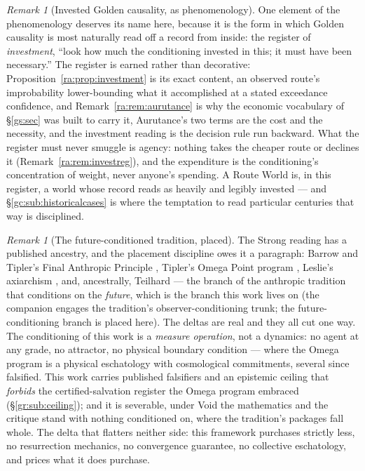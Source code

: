 \documentclass[11pt]{article}
\numberwithin{equation}{section}
\theoremstyle{plain}
\theoremstyle{definition}
\theoremstyle{remark}
\newtheorem{remark}[theorem]{Remark}
\begin{document}
\begin{remark}[Invested Golden causality, as phenomenology]
\label{gc:rem:invested}
One element of the phenomenology deserves its name here, because it is
the form in which Golden causality is most naturally read off a record
from inside: the register of \emph{investment}, ``look how much the
conditioning invested in this; it must have been necessary.'' The
register is earned rather than decorative:
Proposition~\ref{ra:prop:investment} is its exact content, an observed
route's improbability lower-bounding what it accomplished at a stated
exceedance confidence, and Remark~\ref{ra:rem:aurutance} is why the
economic vocabulary of \S\ref{gs:sec} was built to carry it, Aurutance's two terms are the cost and the necessity, and the
investment reading is the decision rule run backward. What the register
must never smuggle is agency: nothing takes the cheaper route or
declines it (Remark~\ref{ra:rem:investreg}), and the expenditure is the
conditioning's concentration of weight, never anyone's spending. A
Route World is, in this register, a world whose record reads as heavily
and legibly invested --- and \S\ref{gc:sub:historicalcases} is where
the temptation to read particular centuries that way is disciplined.
\end{remark}

\begin{remark}[The future-conditioned tradition, placed]
\label{rw:rem:futurecond}
The Strong reading has a published ancestry, and the placement
discipline owes it a paragraph: Barrow and Tipler's Final Anthropic
Principle \cite{BarrowTipler86}, Tipler's Omega Point program
\cite{Tipler94}, Leslie's axiarchism \cite{Leslie79}, and,
ancestrally, Teilhard \cite{Teilhard55} --- the branch of the
anthropic tradition that conditions on the \emph{future}, which is
the branch this work lives on (the companion engages the tradition's
observer-conditioning trunk; the future-conditioning branch is placed
here). The deltas are real and they all cut one way. The conditioning
of this work is a \emph{measure operation}, not a dynamics: no agent
at any grade, no attractor, no physical boundary condition --- where
the Omega program is a physical eschatology with cosmological
commitments, several since falsified. This work carries published
falsifiers and an epistemic ceiling that \emph{forbids} the
certified-salvation register the Omega program embraced
(\S\ref{gr:sub:ceiling}); and it is severable, under Void the
mathematics and the critique stand with nothing conditioned on, where the tradition's packages fall whole. The delta that flatters
neither side: this framework purchases strictly less, no
resurrection mechanics, no convergence guarantee, no collective
eschatology, and prices what it does purchase.
\end{remark}
\end{document}

